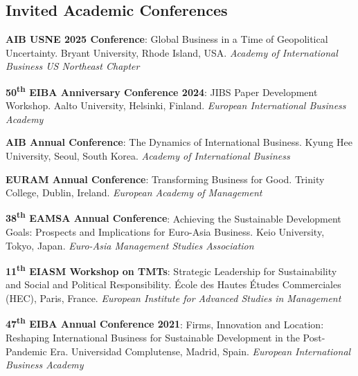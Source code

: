 \documentclass[11pt,a4paper]{article}
\begin{document}
\begin{cv}
\section{Invited Academic Conferences}
 
\begin{cvlist}{}
    \item[2025]
    \textbf{AIB USNE 2025 Conference}: Global Business in a Time of Geopolitical Uncertainty. Bryant University, Rhode Island, USA. \textit{Academy of International Business US Northeast Chapter}
    
    \item[2024]
    \textbf{50\textsuperscript{th} EIBA Anniversary Conference 2024}: JIBS Paper Development Workshop. Aalto University, Helsinki, Finland. \textit{European International Business Academy}
    
    \item[2024]
    \textbf{AIB Annual Conference}: The Dynamics of International Business. Kyung Hee University, Seoul, South Korea. \textit{Academy of International Business}
    
    \item[2023]
    \textbf{EURAM Annual Conference}: Transforming Business for Good. Trinity College, Dublin, Ireland. \textit{European Academy of Management}
    
    \item[2022]
    \textbf{38\textsuperscript{th} EAMSA Annual Conference}: Achieving the Sustainable Development Goals: Prospects and Implications for Euro-Asia Business. Keio University, Tokyo, Japan. \textit{Euro-Asia Management Studies Association}
    
    \item[2022]
    \textbf{11\textsuperscript{th} EIASM Workshop on TMTs}: Strategic Leadership for Sustainability and Social and Political Responsibility. École des Hautes Études Commerciales (HEC), Paris, France. \textit{European Institute for Advanced Studies in Management}
    
    \item[2021]
    \textbf{47\textsuperscript{th} EIBA Annual Conference 2021}: Firms, Innovation and Location: Reshaping International Business for Sustainable Development in the Post-Pandemic Era. Universidad Complutense, Madrid, Spain. \textit{European International Business Academy}
\end{cvlist}



\end{cv}
\end{document}
